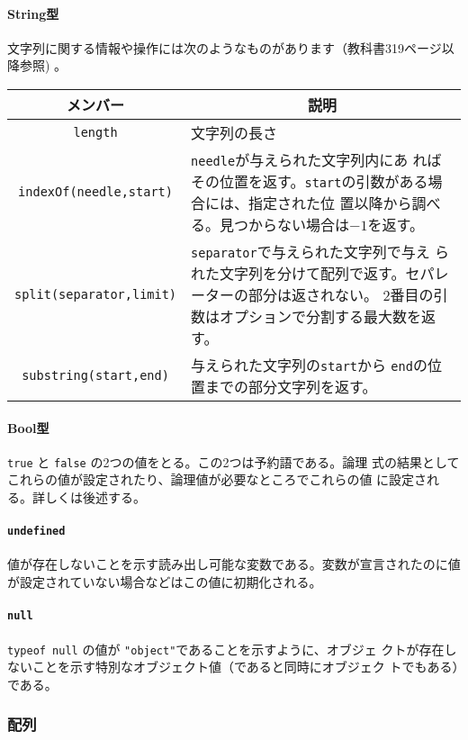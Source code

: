 \documentclass[a4j]{jarticle}
\begin{document}
\paragraph{String型}
文字列に関する情報や操作には次のようなものがあります（教科書319ページ以
降参照) 。
\begin{center}
 \begin{tabular}{|c|m{}|}\hline
 メンバー&\multicolumn{1}{c|}{説明} \\\hline
  \verb+length+ &文字列の長さ\\ \hline
\verb+indexOf(needle,start)+& \verb+needle+が与えられた文字列内にあ
      ればその位置を返す。\verb+start+の引数がある場合には、指定された位
      置以降から調べる。見つからない場合は$-1$を返す。\\\hline
  \verb+split(separator,limit)+&\verb+separator+で与えられた文字列で与え
      られた文字列を分けて配列で返す。セパレーターの部分は返されない。
      2番目の引数はオプションで分割する最大数を返す。\\ \hline
  \verb+substring(start,end)+&与えられた文字列の\verb+start+から
      \verb+end+の位置までの部分文字列を返す。\\ \hline
\end{tabular}
\end{center}
\paragraph{Bool型}
\verb+true+ と \verb+false+ の2つの値をとる。この2つは予約語である。論理
式の結果としてこれらの値が設定されたり、論理値が必要なところでこれらの値
に設定される。詳しくは後述する。
\paragraph{\protect\texttt{undefined}}
値が存在しないことを示す読み出し可能な変数である。変数が宣言されたのに値
が設定されていない場合などはこの値に初期化される。
\paragraph{\protect\texttt{null}}
\verb+typeof null+ の値が \verb+"object"+であることを示すように、オブジェ
クトが存在しないことを示す特別なオブジェクト値（であると同時にオブジェク
トでもある）である。
\subsubsection{配列}
\end{document}
